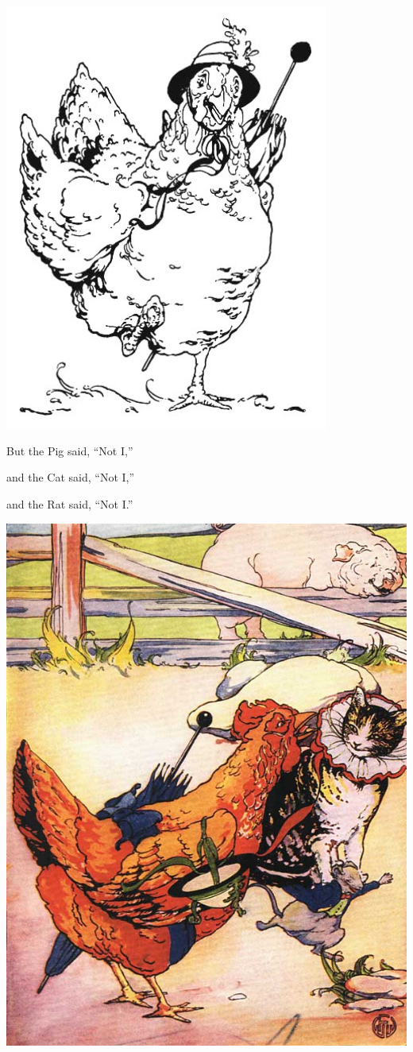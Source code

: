 \documentclass[letterpaper, 10pt, openany]{memoir}
\begin{document}
\includegraphics[width=0.8\textwidth]{image_004.jpg}

But the Pig said, ``Not I,''

and the Cat said, ``Not I,''

and the Rat said, ``Not I.''

\newpage
\begin{center}
	\includegraphics[width=\textwidth]{image_047_1.jpg}
\end{center}
\end{document}
